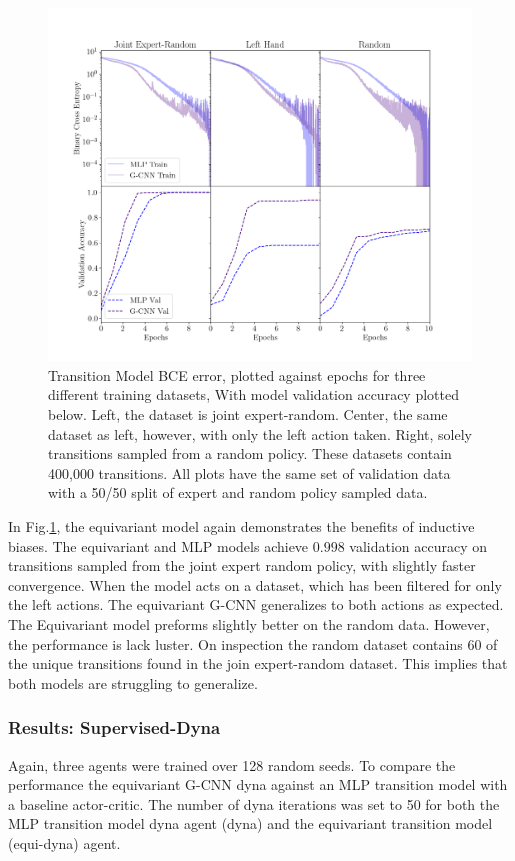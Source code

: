 \begin{figure}
	\centering
	\includegraphics[width=\linewidth]{Figures/transition_model_catch.png}
	\caption{Transition Model BCE error, plotted against epochs for three different training datasets, With model validation accuracy plotted below. Left, the dataset is joint expert-random. Center, the same dataset as left, however, with only the left action taken. Right, solely transitions sampled from a random policy. These datasets contain 400,000 transitions. All plots have the same set of validation data with a 50/50 split of expert and random policy sampled data.}
	\label{fig:transition_model_catch}
\end{figure}

In Fig.\ref{fig:transition_model_catch}, the equivariant model again demonstrates the benefits of inductive biases. The equivariant and MLP models achieve $0.998$ validation accuracy on transitions sampled from the joint expert random policy, with slightly faster convergence. When the model acts on a dataset, which has been filtered for only the left actions. The equivariant G-CNN generalizes to both actions as expected. The Equivariant model preforms slightly better on the random data. However, the performance is lack luster. On inspection the random dataset contains $60$ of the unique transitions found in the join expert-random dataset. This implies that both models are struggling to generalize.

\subsubsection{Results: Supervised-Dyna}
Again, three agents were trained over 128 random seeds. To compare the performance the equivariant G-CNN dyna against an MLP transition model with a baseline actor-critic. The number of dyna iterations was set to 50 for both the MLP transition model dyna agent (dyna) and the equivariant transition model (equi-dyna) agent.

